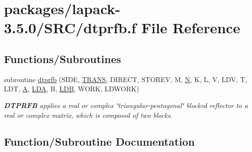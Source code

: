 \hypertarget{dtprfb_8f}{}\section{packages/lapack-\/3.5.0/\+S\+R\+C/dtprfb.f File Reference}
\label{dtprfb_8f}
\subsection*{Functions/\+Subroutines}
\begin{DoxyCompactItemize}
\item 
subroutine \hyperlink{dtprfb_8f_aa6587111426ea9176a800939521c2586}{dtprfb} (S\+I\+D\+E, \hyperlink{superlu__enum__consts_8h_a0c4e17b2d5cea33f9991ccc6a6678d62a1f61e3015bfe0f0c2c3fda4c5a0cdf58}{T\+R\+A\+N\+S}, D\+I\+R\+E\+C\+T, S\+T\+O\+R\+E\+V, M, \hyperlink{polmisc_8c_a0240ac851181b84ac374872dc5434ee4}{N}, K, L, V, L\+D\+V, T, L\+D\+T, \hyperlink{classA}{A}, \hyperlink{example__user_8c_ae946da542ce0db94dced19b2ecefd1aa}{L\+D\+A}, B, \hyperlink{example__user_8c_a50e90a7104df172b5a89a06c47fcca04}{L\+D\+B}, W\+O\+R\+K, L\+D\+W\+O\+R\+K)
\begin{DoxyCompactList}\small\item\em {\bfseries D\+T\+P\+R\+F\+B} applies a real or complex \char`\"{}triangular-\/pentagonal\char`\"{} blocked reflector to a real or complex matrix, which is composed of two blocks. \end{DoxyCompactList}\end{DoxyCompactItemize}


\subsection{Function/\+Subroutine Documentation}
\hypertarget{dtprfb_8f_aa6587111426ea9176a800939521c2586}{}
